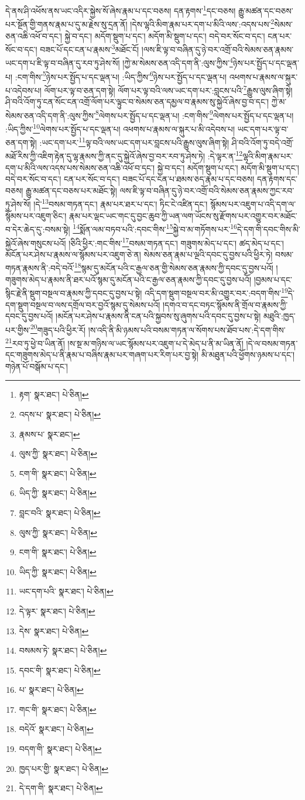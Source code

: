 དེ་ནས་ཤི་འཕོས་ནས་ཡང་འདིར་སྐྱེས་སོ་ཞེས་རྣམ་པ་དང་བཅས། དན་རྟགས་\footnote{རྟག་  སྣར་ཐང་།  པེ་ཅིན། }དང་བཅས། རྒྱུ་མཚན་དང་བཅས་པར་སྔོན་གྱི་གནས་རྣམ་པ་དུ་མ་རྗེས་སུ་དྲན་ནོ། །དེས་ལྷའི་མིག་རྣམ་པར་དག་པ་མིའི་ལས་:འདས་པས་\footnote{འདས་པ་  སྣར་ཐང་།  པེ་ཅིན། }སེམས་ཅན་འཆི་འཕོ་བ་དང་། སྐྱེ་བ་དང་། མདོག་སྡུག་པ་དང་། མདོག་མི་སྡུག་པ་དང་། བདེ་བར་སོང་བ་དང་། ངན་པར་སོང་བ་དང་། བཟང་པོ་དང་ངན་པ་རྣམས་\footnote{རྣམས་པ་  སྣར་ཐང་། }མཐོང་ངོ། །ལས་ཇི་ལྟ་བ་བཞིན་དུ་ཉེ་བར་འགྲོ་བའི་སེམས་ཅན་རྣམས་ཡང་དག་པ་ཇི་ལྟ་བ་བཞིན་དུ་རབ་ཏུ་ཤེས་སོ། །ཀྱེ་མ་སེམས་ཅན་འདི་དག་ནི་:ལུས་ཀྱིས་\footnote{ལུས་ཀྱི་  སྣར་ཐང་།  པེ་ཅིན། }ཉེས་པར་སྤྱོད་པ་དང་ལྡན་པ། :ངག་གིས་\footnote{ངག་གི་  སྣར་ཐང་།  པེ་ཅིན། }ཉེས་པར་སྤྱོད་པ་དང་ལྡན་པ། :ཡིད་ཀྱིས་\footnote{ཡིད་ཀྱི་  སྣར་ཐང་།  པེ་ཅིན། }ཉེས་པར་སྤྱོད་པ་དང་ལྡན་པ། འཕགས་པ་རྣམས་ལ་སྐུར་པ་འདེབས་པ། ལོག་པར་ལྟ་བ་ཅན་དག་སྟེ། ལོག་པར་ལྟ་བའི་ལས་ཡང་དག་པར་:བླངས་པའི་\footnote{བླང་བའི་  སྣར་ཐང་།  པེ་ཅིན། }རྒྱུས་ལུས་ཞིག་སྟེ། ཤི་བའི་འོག་ཏུ་ངན་སོང་ངན་འགྲོ་ལོག་པར་ལྟུང་བ་སེམས་ཅན་དམྱལ་བ་རྣམས་སུ་སྐྱེའོ་ཞེས་བྱ་བ་དང་། ཀྱེ་མ་སེམས་ཅན་འདི་དག་ནི་:ལུས་ཀྱིས་\footnote{ལུས་ཀྱི་  སྣར་ཐང་།  པེ་ཅིན། }ལེགས་པར་སྤྱོད་པ་དང་ལྡན་པ། :ངག་གིས་\footnote{ངག་གི་  སྣར་ཐང་།  པེ་ཅིན། }ལེགས་པར་སྤྱོད་པ་དང་ལྡན་པ། :ཡིད་ཀྱིས་\footnote{ཡིད་ཀྱི་  སྣར་ཐང་།  པེ་ཅིན། }ལེགས་པར་སྤྱོད་པ་དང་ལྡན་པ། འཕགས་པ་རྣམས་ལ་སྐུར་པ་མི་འདེབས་པ། ཡང་དག་པར་ལྟ་བ་ཅན་དག་སྟེ། :ཡང་དག་པར་\footnote{ཡང་དག་པའི་  སྣར་ཐང་།  པེ་ཅིན། }ལྟ་བའི་ལས་ཡང་དག་པར་བླངས་པའི་རྒྱུས་ལུས་ཞིག་སྟེ། ཤི་བའི་འོག་ཏུ་བདེ་འགྲོ་མཐོ་རིས་ཀྱི་འཇིག་རྟེན་དུ་ལྷ་རྣམས་ཀྱི་ནང་དུ་སྐྱེའོ་ཞེས་བྱ་བར་རབ་ཏུ་ཤེས་ཏེ། :དེ་ལྟར་ན་\footnote{དེ་ལྟར་  སྣར་ཐང་།  པེ་ཅིན། }ལྷའི་མིག་རྣམ་པར་དག་པ་མིའི་ལས་འདས་པས་སེམས་ཅན་འཆི་འཕོ་བ་དང་། སྐྱེ་བ་དང་། མདོག་སྡུག་པ་དང་། མདོག་མི་སྡུག་པ་དང་། བདེ་བར་སོང་བ་དང་། ངན་པར་སོང་བ་དང་། བཟང་པོ་དང་ངན་པ་ཐམས་ཅད་རྣམ་པ་དང་བཅས། དན་རྟགས་དང་བཅས། རྒྱུ་མཚན་དང་བཅས་པར་མཐོང་སྟེ། ལས་ཇི་ལྟ་བ་བཞིན་དུ་ཉེ་བར་འགྲོ་བའི་སེམས་ཅན་རྣམས་ཀྱང་རབ་ཏུ་ཤེས་སོ། །དེ་\footnote{དེས་  སྣར་ཐང་།  པེ་ཅིན། }བསམ་གཏན་དང་། རྣམ་པར་ཐར་པ་དང་། ཏིང་ངེ་འཛིན་དང་། སྙོམས་པར་འཇུག་པ་འདི་དག་ལ་སྙོམས་པར་འཇུག་ཅིང་། རྣམ་པར་ལྡང་ཡང་གང་དུ་བྱང་ཆུབ་ཀྱི་ཡན་ལག་ཡོངས་སུ་རྫོགས་པར་འགྱུར་བར་མཐོང་བ་དེར་ཆེད་དུ་:བསམ་སྟེ། \footnote{བསམས་ཏེ་  སྣར་ཐང་།  པེ་ཅིན། }སྨོན་ལམ་བཏབ་པའི་:དབང་གིས་\footnote{དབང་གི་  སྣར་ཐང་།  པེ་ཅིན། }སྐྱེ་བ་མ་གཏོགས་པར་\footnote{པ་  སྣར་ཐང་།  པེ་ཅིན། }དེ་དག་གི་དབང་གིས་མི་སྐྱེའོ་ཞེས་གསུངས་པའོ། །ཅིའི་ཕྱིར་:གང་གིས་\footnote{གང་གི་  སྣར་ཐང་།  པེ་ཅིན། }བསམ་གཏན་དང་། གཟུགས་མེད་པ་དང་། ཚད་མེད་པ་དང་། མངོན་པར་ཤེས་པ་རྣམས་ལ་སྙོམས་པར་འཇུག་ཅེ་ན། སེམས་ཅན་རྣམ་པ་ལྔའི་དབང་དུ་བྱས་པའི་ཕྱིར་ཏེ། བསམ་གཏན་རྣམས་ནི་:བདེ་བའོ་\footnote{བདེའོ་  སྣར་ཐང་།  པེ་ཅིན། }སྙམ་དུ་མངོན་པའི་ང་རྒྱལ་ཅན་གྱི་སེམས་ཅན་རྣམས་ཀྱི་དབང་དུ་བྱས་པའོ། །གཟུགས་མེད་པ་རྣམས་ནི་ཐར་པའོ་སྙམ་དུ་མངོན་པའི་ང་རྒྱལ་ཅན་རྣམས་ཀྱི་དབང་དུ་བྱས་པའོ། །བྱམས་པ་དང་སྙིང་རྗེ་ནི་སྡུག་བསྔལ་བ་རྣམས་ཀྱི་དབང་དུ་བྱས་པ་སྟེ། འདི་དག་སྡུག་བསྔལ་བར་མི་འགྱུར་བར་:བདག་གིས་\footnote{བདག་གི་  སྣར་ཐང་།  པེ་ཅིན། }དེ་དག་སྡུག་བསྔལ་བ་ལས་དགྲོལ་བར་བྱའོ་སྙམ་དུ་སེམས་པའོ། །དགའ་བ་དང་བཏང་སྙོམས་ནི་གྲོལ་བ་རྣམས་ཀྱི་དབང་དུ་བྱས་པའོ། །མངོན་པར་ཤེས་པ་རྣམས་ནི་ངན་པའི་སྐྱབས་སུ་ཞུགས་པའི་དབང་དུ་བྱས་པ་སྟེ། མཐུའི་:ཁྱད་པར་གྱིས་\footnote{ཁྱད་པར་གྱི་  སྣར་ཐང་།  པེ་ཅིན། }གཟུད་པའི་ཕྱིར་རོ། །ས་འདི་ནི་མི་ཉམས་པའི་བསམ་གཏན་ལ་སོགས་པས་ཐོབ་པས་:དེ་དག་གིས་\footnote{དེ་དག་གི་  སྣར་ཐང་།  པེ་ཅིན། }རབ་ཏུ་ཕྱེ་བ་ཡིན་ནོ། །ས་སྔ་མ་གཉིས་ལ་ཡང་སྙོམས་པར་འཇུག་པ་དེ་མེད་པ་ནི་མ་ཡིན་ནོ། །དེ་ལ་བསམ་གཏན་དང་གཟུགས་མེད་པ་ནི་རྣམ་པ་བཞིས་རྣམ་པར་གཞག་པར་རིག་པར་བྱ་སྟེ། མི་མཐུན་པའི་ཕྱོགས་ཉམས་པ་དང་། གཉེན་པོ་བསྒོམ་པ་དང་། 